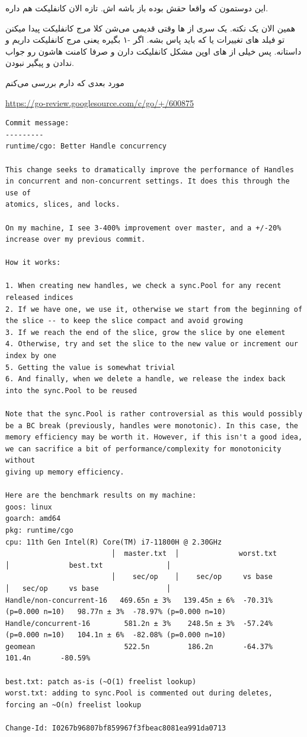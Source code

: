 این دوستمون که واقعا حقش بوده باز باشه \cl اش. تازه الان کانفلیکت هم داره.

همین الان یک نکته. یک سری از \cl ها وقتی قدیمی می‌شن کلا مرج کانفلیکت پیدا میکنن تو فیلد های تغییرات  یا 
که باید پاس بشه. اگر -۱ بگیره یعنی مرج کانفلیکت داریم و داستانه. پس خیلی از \cl های اوپن مشکل کانفلیکت دارن و صرفا کامنت هاشون رو جواب ندادن
و پیگیر نبودن.

مورد بعدی که دارم بررسی می‌کنم

\begin{latin}
\url{https://go-review.googlesource.com/c/go/+/600875}

\begin{verbatim}
Commit message:
---------
runtime/cgo: Better Handle concurrency

This change seeks to dramatically improve the performance of Handles in concurrent and non-concurrent settings. It does this through the use of
atomics, slices, and locks.

On my machine, I see 3-400% improvement over master, and a +/-20% increase over my previous commit.

How it works:

1. When creating new handles, we check a sync.Pool for any recent released indices
2. If we have one, we use it, otherwise we start from the beginning of the slice -- to keep the slice compact and avoid growing
3. If we reach the end of the slice, grow the slice by one element
4. Otherwise, try and set the slice to the new value or increment our index by one
5. Getting the value is somewhat trivial
6. And finally, when we delete a handle, we release the index back into the sync.Pool to be reused

Note that the sync.Pool is rather controversial as this would possibly be a BC break (previously, handles were monotonic). In this case, the
memory efficiency may be worth it. However, if this isn't a good idea, we can sacrifice a bit of performance/complexity for monotonicity without
giving up memory efficiency.

Here are the benchmark results on my machine:
goos: linux
goarch: amd64
pkg: runtime/cgo
cpu: 11th Gen Intel(R) Core(TM) i7-11800H @ 2.30GHz
                         │  master.txt  │              worst.txt               │              best.txt               │
                         │    sec/op    │    sec/op     vs base                │   sec/op     vs base                │
Handle/non-concurrent-16   469.65n ± 3%   139.45n ± 6%  -70.31% (p=0.000 n=10)   98.77n ± 3%  -78.97% (p=0.000 n=10)
Handle/concurrent-16        581.2n ± 3%    248.5n ± 3%  -57.24% (p=0.000 n=10)   104.1n ± 6%  -82.08% (p=0.000 n=10)
geomean                     522.5n         186.2n       -64.37%                  101.4n       -80.59%

best.txt: patch as-is (~O(1) freelist lookup)
worst.txt: adding to sync.Pool is commented out during deletes, forcing an ~O(n) freelist lookup

Change-Id: I0267b96807bf859967f3fbeac8081ea991da0713
\end{verbatim}
\end{latin}


